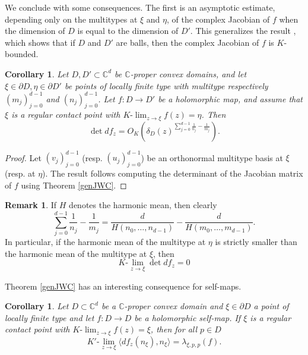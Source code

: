 \documentclass[11pt, reqno]{amsart}
\numberwithin{equation}{section}
\newtheorem{corollary}[theorem]{Corollary}
\theoremstyle{definition}
\newtheorem{remark}[theorem]{Remark}
\newcommand{\C}{\mathbb{C}}
\begin{document}
{{{		
		We conclude with some consequences. The first is an asymptotic estimate, depending only on the multitypes at $\xi$ and $\eta$, of the complex Jacobian  of $f$ when the dimension of $D$ is equal to the dimension of $D'$. This generalizes the result \cite[Corollary, p.178]{Rudin}, which shows that if $D$ and $D'$ are balls, then the complex Jacobian  of $f$ is $K$-bounded.  \begin{corollary}
			Let $D,D'\subset\C^d$ be  $\C$-proper convex domains, and let $\xi\in\partial D,\eta\in \partial D'$ be points of locally finite type with multitype respectively $(m_j)_{j=0}^{d-1}$ and $(n_j)_{j=0}^{d-1}$.  Let $f\colon D\to D'$ be a holomorphic map, and 
			assume that $\xi$ is a regular contact point with   $K\textrm{-}\lim_{z\to\xi}f(z)=\eta$.
			Then $$\det df_z=O_K\left(\delta_D(z)^{\sum_{j=0}^{d-1}\frac{1}{n_j}-\frac{1}{m_j}}    \right).$$
		\end{corollary}
		\begin{proof}
			Let $(v_j)_{j=0}^{d-1}$ (resp. $(u_j)_{j=0}^{d-1}$) be an orthonormal  multitype basis at $\xi$ (resp. at $\eta$). 
			The result follows  computing the determinant of the Jacobian matrix of $f$ using Theorem \ref{genJWC}.
		\end{proof}
		\begin{remark}
			If $H$ denotes the harmonic mean, then clearly
			$$\sum_{j=0}^{d-1}\frac{1}{n_j}-\frac{1}{m_j}=\frac{d}{H(n_0,\dots, n_{d-1})}-\frac{d}{H(m_0,\dots, m_{d-1})}.$$
			In particular, if the harmonic mean of the multitype at $\eta$ is strictly smaller than the harmonic mean of the multitype at $\xi$, then 
			$$K\textrm{-}\lim_{z\to \xi} \det df_z=0$$
			
			
		\end{remark}
		
		Theorem \ref{genJWC} has an interesting consequence for self-maps.
		\begin{corollary}
			Let $D\subset\C^d$ be a $\C$-proper convex domain and $\xi\in\partial D$ a point of locally finite type  and let $f\colon D\to D$ be a holomorphic self-map.
			If $\xi$ is a regular contact point with $K\textrm{-}\lim_{z\to\xi}f(z)=\xi$,
			then for all $p\in D$
			$$K'\textrm{-}\lim_{z\to\xi}\langle df_z(n_\xi),n_\xi\rangle=\lambda_{\xi,p,p}(f).$$
		\end{corollary}
		
}}}
\end{document}
